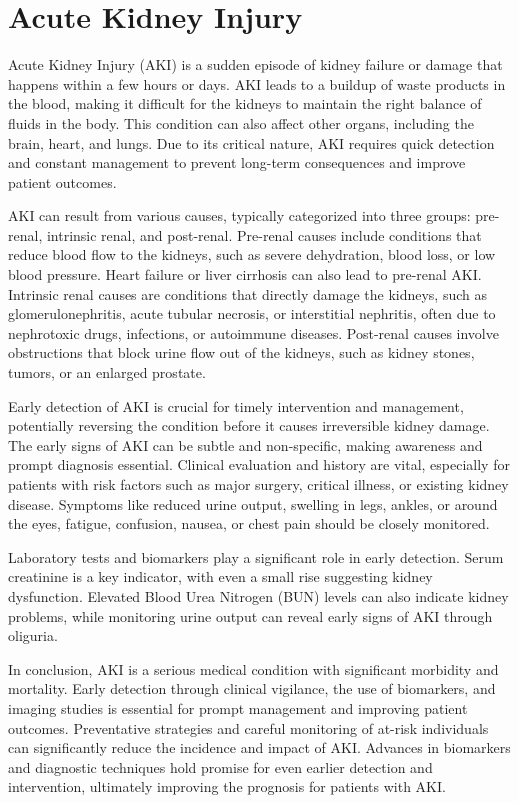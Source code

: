\documentclass[../main.tex]{subfiles}
\begin{document}
\section{Acute Kidney Injury}
Acute Kidney Injury (AKI) is a sudden episode of kidney failure or damage that happens within a few hours or days. 
AKI leads to a buildup of waste products in the blood, making it difficult for the kidneys to maintain the right balance of fluids in the body. 
This condition can also affect other organs, including the brain, heart, and lungs. Due to its critical nature, AKI requires quick detection and constant management to prevent long-term consequences and improve patient outcomes.

AKI can result from various causes, typically categorized into three groups: pre-renal, intrinsic renal, and post-renal. 
Pre-renal causes include conditions that reduce blood flow to the kidneys, such as severe dehydration, blood loss, or low blood pressure. 
Heart failure or liver cirrhosis can also lead to pre-renal AKI.
Intrinsic renal causes are conditions that directly damage the kidneys, such as glomerulonephritis, acute tubular necrosis, or interstitial nephritis, often due to nephrotoxic drugs, infections, or autoimmune diseases. %
Post-renal causes involve obstructions that block urine flow out of the kidneys, such as kidney stones, tumors, or an enlarged prostate.
 
Early detection of AKI is crucial for timely intervention and management, potentially reversing the condition before it causes irreversible kidney damage. 
The early signs of AKI can be subtle and non-specific, making awareness and prompt diagnosis essential. 
Clinical evaluation and history are vital, especially for patients with risk factors such as major surgery, critical illness, or existing kidney disease. 
Symptoms like reduced urine output, swelling in legs, ankles, or around the eyes, fatigue, confusion, nausea, or chest pain should be closely monitored.

Laboratory tests and biomarkers play a significant role in early detection. 
Serum creatinine is a key indicator, with even a small rise suggesting kidney dysfunction. 
Elevated Blood Urea Nitrogen (BUN) levels can also indicate kidney problems, while monitoring urine output can reveal early signs of AKI through oliguria. 

In conclusion, AKI is a serious medical condition with significant morbidity and mortality. 
Early detection through clinical vigilance, the use of biomarkers, and imaging studies is essential for prompt management and improving patient outcomes. 
Preventative strategies and careful monitoring of at-risk individuals can significantly reduce the incidence and impact of AKI. 
Advances in biomarkers and diagnostic techniques hold promise for even earlier detection and intervention, ultimately improving the prognosis for patients with AKI.
\end{document}
